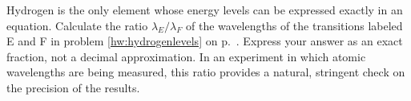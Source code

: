 Hydrogen is the only element whose energy levels can be expressed exactly in an equation.
Calculate the ratio $\lambda_E/\lambda_F$ of the wavelengths of the transitions labeled
E and F in problem \ref{hw:hydrogenlevels} on p.~\pageref{hw:hydrogenlevels}. Express
your answer as an exact fraction, not a decimal approximation. In an experiment in which
atomic wavelengths are being measured, this ratio provides a natural, stringent check on
the precision of the results.\answercheck
